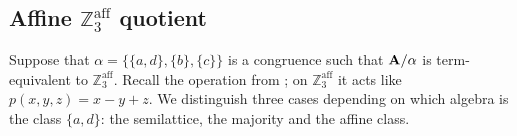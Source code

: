 \documentclass[11pt]{amsart}
\newcommand{\m}[1]{\mathbf{\uppercase{#1}}}
\theoremstyle{definition}
\theoremstyle{remark}
\theoremstyle{plain}
\begin{document}
\begin{enumerate}[wide, labelindent=0pt]
\begin{enumerate}[wide, labelindent=0pt]
\end{enumerate}
\end{enumerate}


\subsection{Affine $\mathbb{Z}^{\text{aff}}_3$ quotient}\label{s:Z3}
Suppose that $\alpha=\{\{a,d\},\{b\},\{c\}\}$ is a congruence such that $\m a/\alpha$ is term-equivalent to $\mathbb{Z}^{\text{aff}}_3$. Recall the operation from ; on $\mathbb{Z}^{\text{aff}}_3$ it acts like $p(x,y,z)=x-y+z$. We distinguish three cases depending on which algebra is the class $\{a,d\}$: the semilattice, the majority and the affine class. 
\end{document}
